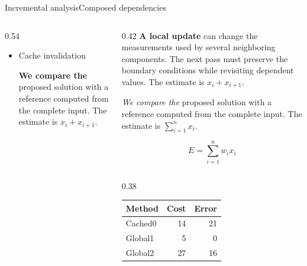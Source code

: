 \documentclass[10pt,aspectratio=169]{beamer}
\begin{document}
\begin{frame}[t,shrink=5]{Incremental analysis}{Composed dependencies}
\begin{columns}[onlytextwidth,b]
\begin{column}{0.54\textwidth}
\begin{itemize}
\begin{enumerate}
\begin{enumerate}
\end{enumerate}
\end{enumerate}
\item<2-> \begin{alertblock}{Cache invalidation}
\begin{center}
\textbf{We compare the} proposed solution with a reference computed from the complete input.  The estimate is $x_i+x_{i+1}$.
\end{center}
\end{alertblock}
\end{itemize}
\end{column}
\begin{column}{0.42\textwidth}
\textbf{A local update} can change the measurements used by several neighboring components. The next pass must preserve the boundary conditions while revisiting dependent values. The estimate is $x_i+x_{i+1}$.
\par
\textit{We compare the} proposed solution with a reference computed from the complete input.  The estimate is $\sum_{i=1}^{n}x_i$.
\par
\[E=\sum_{i=1}^{n}w_i x_i\]
\par
\begin{columns}[onlytextwidth,c]
\begin{column}{0.38\textwidth}
\begin{tabular}{lrr}Method&Cost&Error\\\hline
Cached0&14&21\\
Global1&5&0\\
Global2&27&16\\
\end{tabular}

\end{column}
\end{columns}
\end{column}
\end{columns}
\end{frame}
\end{document}
